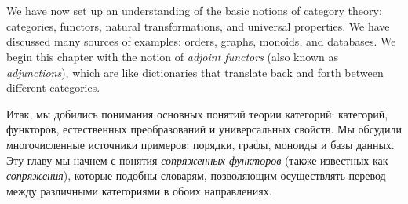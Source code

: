 \documentclass[CT4S-EN-RU]{subfiles}
\begin{document}
\section*{}

\begin{blockENG}
We have now set up an understanding of the basic notions of category theory: categories, functors, natural transformations, and universal properties. We have discussed many sources of examples: orders, graphs, monoids, and databases. We begin this chapter with the notion of {\em adjoint functors} (also known as {\em adjunctions}), which are like dictionaries that translate back and forth between different categories. 
\end{blockENG}

\begin{blockRUS}
Итак, мы добились понимания основных понятий теории категорий: категорий, функторов, естественных преобразований и универсальных свойств. Мы обсудили многочисленные источники примеров: порядки, графы, моноиды и базы данных. Эту главу мы начнем с понятия {\em сопряженных функторов} (также известных как {\em сопряжения}), которые подобны словарям, позволяющим осуществлять перевод между различными категориями в обоих направлениях. 
\end{blockRUS}
\end{document}

